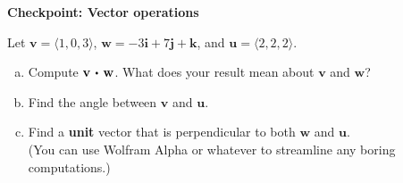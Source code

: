 \documentclass[12pt]{article}
\newcommand{\vu}{\mathbf{u}}
\newcommand{\vv}{\mathbf{v}}
\newcommand{\vw}{\mathbf{w}}
\newcommand{\vi}{\mathbf{i}}
\newcommand{\vj}{\mathbf{j}}
\newcommand{\vk}{\mathbf{k}}
\newcommand\dotp[1][.5]{\,\mathbin{\vcenter{\hbox{\scalebox{#1}{$\bullet$}}}}\,}
\renewcommand{\section}[1]{\begin{center} \textbf{#1} \\\end{center}}
\begin{document}
%


\allowdisplaybreaks
\section{Checkpoint: Vector operations }
Let $\vv = \langle 1, 0, 3 \rangle $, $\vw = -3\vi + 7\vj +\vk$, and $\vu = \langle 2,2,2 \rangle$.

\begin{enumerate}[(a)]
    \item Compute $\vv\dotp\vw$. What does your result mean about $\vv$ and $\vw$?
    \item Find the angle between $\vv$ and $\vu$.
    \item Find a \textbf{unit} vector that is perpendicular to both $\vw$ and $\vu$.\\ (You can use Wolfram Alpha or whatever to streamline any boring computations.)
\end{enumerate}
	
\end{document}
